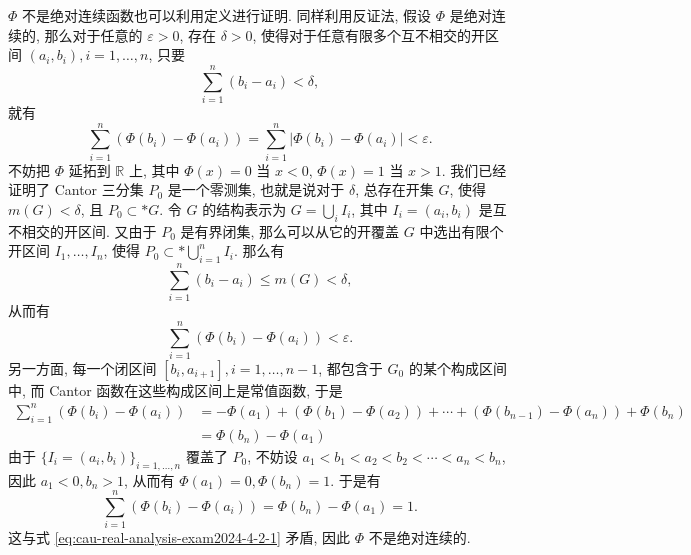 \begin{solution}
\begin{enumerate}
\(\Phi\) 不是绝对连续函数也可以利用定义进行证明. 同样利用反证法, 假设 \(\Phi\) 是绝对连续的,  那么对于任意的 \(\varepsilon > 0\), 存在 \(\delta > 0\), 使得对于任意有限多个互不相交的开区间 \((a_i, b_i), i = 1, \dots, n\), 只要
\[\sum\limits_{i=1}^{n} (b_i - a_i) < \delta,\]
就有
\[\sum\limits_{i=1}^{n} (\Phi(b_i) - \Phi(a_i)) = \sum\limits_{i=1}^{n} \lvert \Phi(b_i) - \Phi(a_i) \rvert < \varepsilon.\]
不妨把 \(\Phi\) 延拓到 \(\mathbb{R}\) 上, 其中 \(\Phi(x) = 0\) 当 \(x < 0\), \(\Phi(x) = 1\) 当 \(x > 1\). 我们已经证明了 Cantor 三分集 \(P_0\) 是一个零测集, 也就是说对于 \(\delta\), 总存在开集 \(G\), 使得 \(m(G) < \delta\), 且 \(P_0 \subset* G\). 令 \(G\) 的结构表示为 \(G = \bigcup\limits_{i} I_i\), 其中 \(I_i = (a_i, b_i)\) 是互不相交的开区间. 又由于 \(P_0\) 是有界闭集, 那么可以从它的开覆盖 \(G\) 中选出有限个开区间 \(I_1, \dots, I_n\), 使得 \(P_0 \subset* \bigcup\limits_{i=1}^{n} I_i\). 那么有
\[\sum\limits_{i=1}^{n} (b_i - a_i) \leqslant m(G) < \delta,\]
从而有
\begin{equation}
\label{eq:cau-real-analysis-exam2024-4-2-1}
\sum\limits_{i=1}^{n} (\Phi(b_i) - \Phi(a_i)) < \varepsilon.
\end{equation}
另一方面, 每一个闭区间 \([b_i, a_{i+1}], i = 1, \dots, n-1\), 都包含于 \(G_0\) 的某个构成区间中, 而 Cantor 函数在这些构成区间上是常值函数, 于是
\[\begin{aligned}
\sum\limits_{i=1}^{n} (\Phi(b_i) - \Phi(a_i)) & = -\Phi(a_1) + (\Phi(b_1) - \Phi(a_2)) + \cdots + (\Phi(b_{n-1}) - \Phi(a_n)) + \Phi(b_n) \\
& = \Phi(b_n) - \Phi(a_1)
\end{aligned}\]
由于 \(\{I_i = (a_i, b_i)\}_{i = 1, \dots, n}\) 覆盖了 \(P_0\), 不妨设 \(a_1 < b_1 < a_2 < b_2 < \cdots < a_n < b_n\), 因此 \(a_1 < 0, b_n > 1\), 从而有 \(\Phi(a_1) = 0, \Phi(b_n) = 1\). 于是有
\[\sum\limits_{i=1}^{n} (\Phi(b_i) - \Phi(a_i)) = \Phi(b_n) - \Phi(a_1) = 1.\]
这与式 \eqref{eq:cau-real-analysis-exam2024-4-2-1} 矛盾, 因此 \(\Phi\) 不是绝对连续的.
\end{enumerate}
\end{solution}


